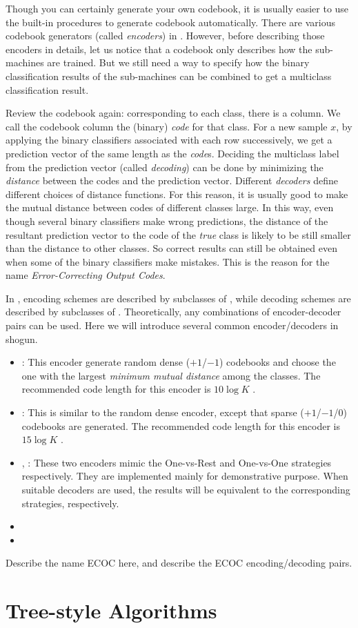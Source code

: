 Though you can certainly generate your own codebook, it is usually easier to
use the \shogun{} built-in procedures to generate codebook automatically. There
are various codebook generators (called \emph{encoders}) in \shogun{}. However,
before describing those encoders in details, let us notice that a codebook 
only describes how the sub-machines are trained. But we still need a
way to specify how the binary classification results of the sub-machines can be
combined to get a multiclass classification result.

Review the codebook again: corresponding to each class, there is a column. We
call the codebook column the (binary) \emph{code} for that class. For a new
sample $x$, by applying the binary classifiers associated with each row
successively, we get a prediction vector of the same length as the
\emph{code}s. Deciding the multiclass label from the prediction vector (called
\emph{decoding}) can be done by minimizing the \emph{distance} between the
codes and the prediction vector. Different \emph{decoders} define different 
choices of distance functions. For this reason, it is usually good to make the
mutual distance between codes of different classes large. In this way, even
though several binary classifiers make wrong predictions, the distance of
the resultant prediction vector to the code of the \emph{true} class is likely
to be still smaller than the distance to other classes. So correct results can
still be obtained even when some of the binary classifiers make mistakes. This
is the reason for the name \emph{Error-Correcting Output Codes}.

In \shogun{}, encoding schemes are described by subclasses of
, while decoding schemes are described by subclasses
of . Theoretically, any combinations of
encoder-decoder pairs can be used. Here we will introduce several common
encoder/decoders in shogun.

\begin{itemize}
    \item {}: This encoder generate random
        dense ($+1$/$-1$) codebooks and choose the one with the largest
        \emph{minimum mutual distance} among the classes. The recommended code
        length for this encoder is $10\log K$ \citep{ECOCUnify}.
    \item {}: This is similar to the random
        dense encoder, except that sparse ($+1$/$-1$/$0$) codebooks are
        generated. The recommended code length for this encoder is $15\log K$
        \citep{EscaleraPR09}.
    \item {}, : These
        two encoders mimic the One-vs-Rest and One-vs-One strategies
        respectively. They are implemented mainly for demonstrative purpose. 
        When suitable decoders are used, the results will be
        equivalent to the corresponding strategies, respectively.
    \item {}
    \item {}
\end{itemize}

Describe the name ECOC here, and describe the \shogun{} ECOC encoding/decoding
pairs.

\section{Tree-style Algorithms}
\label{sec:multiclass-tree}
